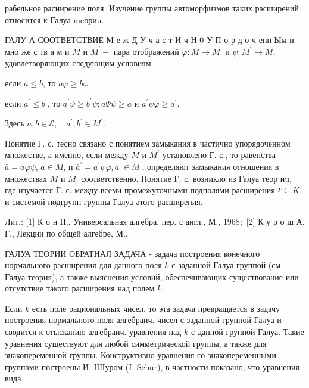 \documentclass[10pt]{article}
\begin{document}
рабельное расиирение поля. Изучение группы автоморфизмов таких расширений относится к Галуа meориu.



ГАЛУ А СООТВЕТСТВИЕ М е ж Д У ч а с т И ч Н 0 У П о р д о ч енн Ым и мно же с тв а м и $M$ и $M^{\prime}-$ пара отображений $\varphi: M \rightarrow M^{\prime}$ и $\psi: M^{\prime} \rightarrow M$, удовлетворяющих следующим условиям:



если $a \leqslant b$, то $a \varphi \geqslant b \varphi$



если $a^{\prime} \leqslant b^{\prime}$, то $a^{\prime} \psi \geqslant b^{\prime} \psi ; a \Psi \psi \geqslant a$ и $a^{\prime} \psi \varphi \geqslant a^{\prime}$.



Здесь $a, b \in \mathcal{E}, \quad a^{\prime}, b^{\prime} \in M^{\prime}$.



Понятие Г. с. тесно связано с понятием замыкания в частично упорядоченном множестве, а именно, если между $M$ и $M^{\prime}$ установлено $Г$. с., то равенства $\bar{a}=a \varphi \psi$, $a \in M$, п $\bar{a}^{\prime}=a^{\prime} \psi \varphi, a^{\prime} \in M^{\prime}$, определяют замыкания отношения в множествах $M$ и $M^{\prime}$ соответственно. Понятие Г. с. возникло из Галуа теор иu, где изучается Г. с. между всеми промежуточными подполями расширения $\stackrel{P}{ } \subseteq K$ и системой подгрупп группы Галуа әтого расширения.



Лит.: [1] К о н П., Универсальная алгебра, пер. с англ., М., $1968 ;$ [2] К у р о ш А. Г., Лекции по общей алгебре, М.,



ГАЛУА ТЕОРИИ ОБРАТНАЯ ЗАДАЧА - задача построения конечного нормального расширения для данного поля $k$ с заданной Галуа группой (см. Галуа теория), а также выяснения условий, обеспечивающих существование или отсутствие такого расширения над полем $k$.



Если $k$ есть поле рациональных чисел, то эта задача превращается в задачу построения нормального поля алгебраич. чисел с заданной группой Галуа и сводится к отысканию алгебраич. уравнения над $k$ с данной группой Галуа. Такие уравнения существуют для любой симметрической группы, а также для знакопеременной группы. Конструктивно уравнения со знакопеременными группами построены И. ШІуром (I. Schur), в частности показано, что уравнения вида
\end{document}
